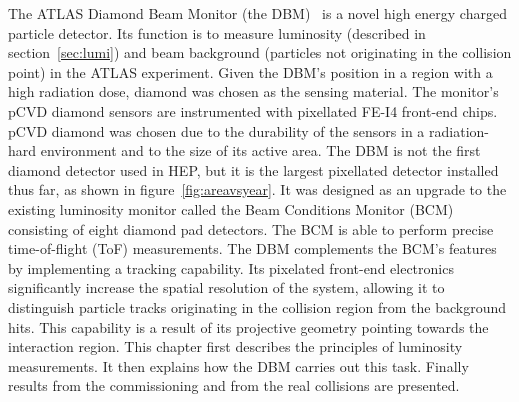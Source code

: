 The ATLAS Diamond Beam Monitor (the DBM)~\cite{Cerv:1630832} is a novel high energy charged particle detector. Its function is to measure luminosity (described in section~\ref{sec:lumi}) and beam background (particles not originating in the collision point) in the ATLAS experiment. Given the DBM's position in a region with a high radiation dose, diamond was chosen as the sensing material. The monitor's pCVD diamond sensors are instrumented with pixellated FE-I4 front-end chips. pCVD diamond was chosen due to the durability of the sensors in a radiation-hard environment and to the size of its active area. The DBM is not the first diamond detector used in HEP, but it is the largest pixellated detector installed thus far, as shown in figure~\ref{fig:areavsyear}. It was designed as an upgrade to the existing luminosity monitor called the Beam Conditions Monitor (BCM)~\cite{Gorisek:1062633} consisting of eight diamond pad detectors. The BCM is able to perform precise time-of-flight (ToF) measurements. The DBM complements the BCM's features by implementing a tracking capability. Its pixelated front-end electronics significantly increase the spatial resolution of the system, allowing it to distinguish particle tracks originating in the collision region from the background hits. This capability is a result of its projective geometry pointing towards the interaction region. This chapter first describes the principles of luminosity measurements. It then explains how the DBM carries out this task. Finally results from the commissioning and from the real collisions are presented. 


